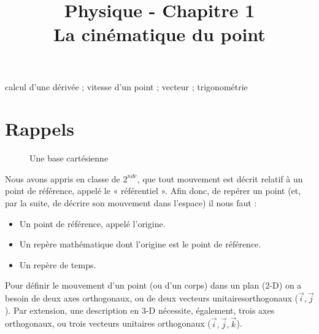 \documentclass[11pt,a4paper]{article}
\title{\large Physique - Chapitre 1 \\ \LARGE La cinématique du point}
\date{}
\author{}
\begin{document}
\maketitle

\vspace{-1cm}

\begin{tcolorbox}[title=Notions de la classe de première à rappeler]
calcul d'une dérivée ; vitesse d'un point ; vecteur ; trigonométrie
\end{tcolorbox}
\tableofcontents
\section{Rappels}

\begingroup
\setlength{\columnsep}{5pt}%
\begin{figure}
    \centering
    \caption{Une base cartésienne}    
\end{figure}

Nous avons appris en classe de $2^{nde}$, que tout mouvement est décrit relatif à un point de référence, appelé le « référentiel ».  Afin donc, de repérer un point (et, par la suite, de décrire son mouvement dans l’espace) il nous faut :

\begin{itemize}
    \item Un point de référence, appelé l'origine. 
    \item Un repère mathématique dont l’origine est le point de référence.
    \item Un repère de temps. 
\end{itemize}

\endgroup

Pour définir le mouvement d’un point (ou d’un corps) dans un plan (2-D) on a besoin de deux axes orthogonaux, ou de deux vecteurs unitairesorthogonaux ($\Vec{i}, \Vec{j}$).  Par extension, une description en 3-D nécessite, également, trois axes orthogonaux, ou trois vecteurs unitaires orthogonaux ($\Vec{i}, \Vec{j}, \Vec{k}$).   
\end{document}
